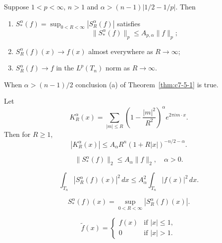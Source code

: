 \begin{theorem}\label{thm:c7-5-1}
Suppose $1 < p < \infty$, $n > 1$ and $\alpha > (n-1)|1/2 - 1/p|$. Then
\begin{enumerate}
\item[(a)] $S_*^\alpha(f) = \sup_{0 < R < \infty} |S_R^\alpha(f)|$ satisfies
\[
\|S_*^\alpha(f)\|_p \leq A_{p,\alpha} \|f\|_p;
\]
\item[(b)] $S_R^\alpha(f)(x) \to f(x)$ almost everywhere as $R \to \infty$;
\item[(c)] $S_R^\alpha(f) \to f$ in the $L^p(T_n)$ norm as $R \to \infty$.
\end{enumerate}
\end{theorem}

\begin{lemma}\label{lem:c7-5-2}
When $\alpha > (n-1)/2$ conclusion (a) of Theorem~\ref{thm:c7-5-1} is true.
\end{lemma}

\begin{lemma}\label{lem:c7-5-3}
Let
\begin{equation}\label{eq:c7-5-4}
K_R^\alpha(x) = \sum_{|m| \leq R} \left(1 - \frac{|m|^2}{R^2}\right)^\alpha e^{2\pi i m \cdot x}.
\end{equation}
Then for $R \geq 1$,
\begin{equation}\label{eq:c7-5-5}
|K_R^\alpha(x)| \leq A_\alpha R^n (1 + R|x|)^{-n/2 - \alpha}.
\end{equation}
\end{lemma}

\begin{equation}\label{eq:c7-5-6}
\|S_*^\alpha(f)\|_2 \leq A_\alpha \|f\|_2, \quad \alpha > 0.
\end{equation}

\begin{equation}\label{eq:c7-5-7}
\int_{T_n} |S_R^\alpha(f)(x)|^2\,dx \leq A_\alpha^2 \int_{T_n} |f(x)|^2\,dx.
\end{equation}

\begin{equation}\label{eq:c7-5-8}
S_*^\alpha(f)(x) = \sup_{0 < R < \infty} |S_R^\alpha(f)(x)|.
\end{equation}

\begin{equation}\label{eq:c7-5-9}
\tilde{f}(x) = \begin{cases} f(x) & \text{if } |x| \leq 1, \\ 0 & \text{if } |x| > 1. \end{cases}
\end{equation}

